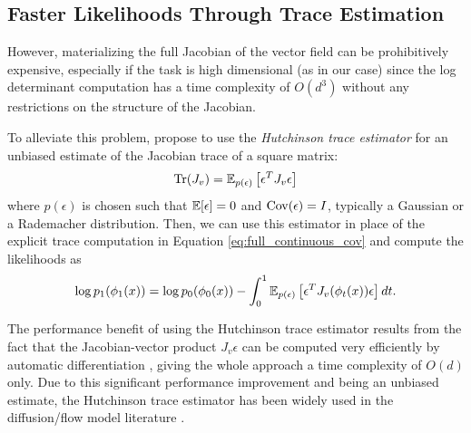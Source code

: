 \subsection{Faster Likelihoods Through Trace Estimation} \label{section:trace_estimation}

However, materializing the full Jacobian of the vector field can be prohibitively expensive, especially if the task is high dimensional (as in our case) since the log determinant computation has a time complexity of $O(d^3)$ \citep{grathwohlFFJORDFreeformContinuous2018} without any restrictions on the structure of the Jacobian. 

To alleviate this problem, \citep{grathwohlFFJORDFreeformContinuous2018} propose to use the \textit{Hutchinson trace estimator} \citep{hutchinsonStochasticEstimatorTrace1990} for an unbiased estimate of the Jacobian trace of a square matrix: 
\begin{equation} \label{eq:hutchinson}
    \operatorname{Tr}(J_v) = \mathbb{E}_{p(\epsilon)} \left[ \epsilon^T J_v \epsilon \right]
\end{equation}
where $p(\epsilon)$ is chosen such that $\mathbb{E}[\epsilon] = 0$ and $\operatorname{Cov}(\epsilon) = I$, typically a Gaussian or a Rademacher distribution. Then, we can use this estimator in place of the explicit trace computation in Equation \ref{eq:full_continuous_cov} and compute the likelihoods as
\begin{equation}
    \log p_1(\phi_1(x)) = \log p_0(\phi_0(x)) - \int_0^1 \mathbb{E}_{p(\epsilon)} \left[ \epsilon^T J_v(\phi_t(x)) \epsilon \right] dt.
\end{equation}

The performance benefit of using the Hutchinson trace estimator results from the fact that the Jacobian-vector product $J_v \epsilon$ can be computed very efficiently by automatic differentiation \citep{baydinAutomaticDifferentiationMachine2018}, giving the whole approach a time complexity of $O(d)$ only. Due to this significant performance improvement and being an unbiased estimate, the Hutchinson trace estimator has been widely used in the diffusion/flow model literature \citep{lipmanFlowMatchingGenerative2023,songScoreBasedGenerativeModeling2021a}.


